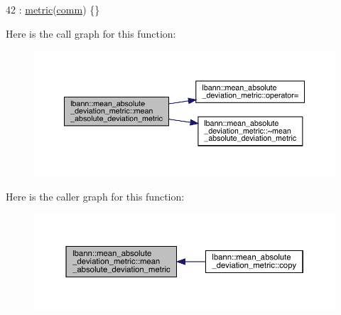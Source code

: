 \begin{DoxyCode}
42 : \hyperlink{classlbann_1_1metric_a3cd2d4f7dcbf94f70b3b8560a3171d9d}{metric}(\hyperlink{file__io_8cpp_ab048c6f9fcbcfaa57ce68b00263dbebe}{comm}) \{\}
\end{DoxyCode}
Here is the call graph for this function\+:\nopagebreak
\begin{figure}[H]
\begin{center}
\leavevmode
\includegraphics[width=350pt]{classlbann_1_1mean__absolute__deviation__metric_afb98a53d7a6f0981d80f5c74fd6ce25a_cgraph}
\end{center}
\end{figure}
Here is the caller graph for this function\+:\nopagebreak
\begin{figure}[H]
\begin{center}
\leavevmode
\includegraphics[width=350pt]{classlbann_1_1mean__absolute__deviation__metric_afb98a53d7a6f0981d80f5c74fd6ce25a_icgraph}
\end{center}
\end{figure}
\mbox{\label{classlbann_1_1mean__absolute__deviation__metric_a15c988cd4a265d050eaf6b9c424c3683}} 
